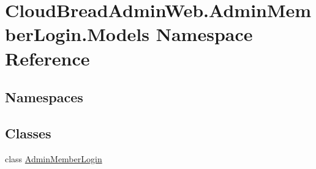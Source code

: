 \hypertarget{namespace_cloud_bread_admin_web_1_1_admin_member_login_1_1_models}{}\section{Cloud\+Bread\+Admin\+Web.\+Admin\+Member\+Login.\+Models Namespace Reference}
\label{namespace_cloud_bread_admin_web_1_1_admin_member_login_1_1_models}
\subsection*{Namespaces}
\begin{DoxyCompactItemize}
\end{DoxyCompactItemize}
\subsection*{Classes}
\begin{DoxyCompactItemize}
\item 
class \hyperlink{class_cloud_bread_admin_web_1_1_admin_member_login_1_1_models_1_1_admin_member_login}{Admin\+Member\+Login}
\end{DoxyCompactItemize}
